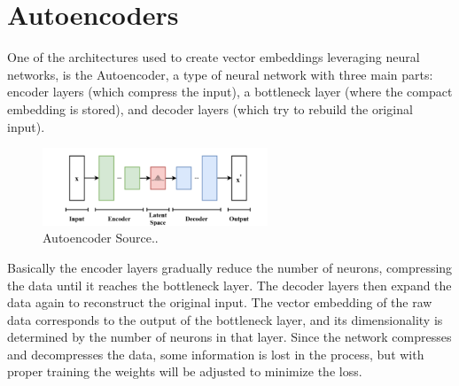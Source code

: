 \section{Autoencoders}
One of the architectures used to create vector embeddings leveraging neural networks, is the Autoencoder, a type of neural network with three main parts: encoder layers (which compress the input), a bottleneck layer (where the compact embedding is stored), and decoder layers (which try to rebuild the original input). 
\begin{figure}[h]
    \centering
    \includegraphics[width=0.6\textwidth]{IMAGES/immagine_2025-02-26_154609390.png}
    \caption[AutoEncoder]{Autoencoder Source.\footnotemark.}
    \label{fig:Autoencoder}
\end{figure}
Basically the encoder layers gradually reduce the number of neurons, compressing the data until it reaches the bottleneck layer. The decoder layers then expand the data again to reconstruct the original input. The vector embedding of the raw data corresponds to the output of the bottleneck layer, and its dimensionality is determined by the number of neurons in that layer. Since the network compresses and decompresses the data, some information is lost in the process, but with proper training the weights will be adjusted to minimize the loss. 

